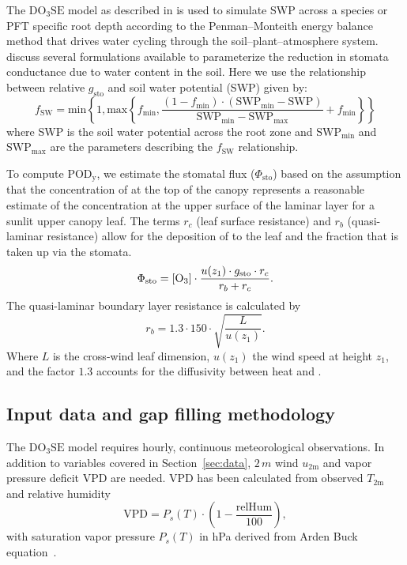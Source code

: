 \documentclass[bg, manuscript]{copernicus}
\begin{document}
The $\mathrm{DO_3SE}$ model as described in \citet{ACP:Bueker2012} is used to simulate SWP across a species or PFT specific root depth according to the Penman--Monteith energy balance method that drives water cycling through the soil--plant--atmosphere system. \citet{ACP:Bueker2012} discuss several formulations available to parameterize the reduction in stomata conductance due to water content in the soil. Here we use the relationship between relative $g_\mathrm{sto}$ and soil water potential (SWP) given by:
%
\begin{equation}
  f_\mathrm{SW} = \text{min}\left\{1, \text{max}\left\{f_\mathrm{min}, \frac{(1 - f_\mathrm{min})\cdot(\mathrm{SWP_{min}} - \mathrm{SWP})}{\mathrm{SWP_{min}} - \mathrm{SWP_{max}}} + f_\mathrm{min} \right\} \right\}
    \label{eq:fsw}
\end{equation}
%
where SWP is the soil water potential across the root zone and $\mathrm{SWP_{min}}$ and $\mathrm{SWP_{max}}$ are the parameters describing the $f_\mathrm{SW}$ relationship.

To compute $\mathrm{POD_y}$, we estimate the stomatal  flux ($\Phi_\mathrm{sto}$) based on the assumption that the concentration of  at the top of the canopy represents a reasonable estimate of the concentration at the upper surface of the laminar layer for a sunlit upper canopy leaf. The terms $r_c$ (leaf surface resistance) and $r_b$ (quasi-laminar resistance) allow for the deposition of  to the leaf and the fraction that is taken up via the stomata. 
%
\begin{equation}
  \Phi_\mathrm{sto} = \chem{[O_3]} \cdot \frac{u(z_1) \cdot g_\mathrm{sto} \cdot r_c}{r_b + r_c}.
  \label{eq:flux_stomata}
\end{equation}
%
The quasi-laminar boundary layer resistance is calculated by
%
\begin{equation}
  r_b = 1.3 \cdot 150 \cdot \sqrt{\frac{L}{u(z_1)}}.
  \label{eq:quasi_laminar_resist}
\end{equation}
%
Where $L$ is the cross-wind leaf dimension, $u(z_1)$ the wind speed at height $z_1$, and the factor $1.3$ accounts for the diffusivity between heat and . 

\subsection{Input data and gap filling methodology}
\label{subsec:ozone_reco}
The $\mathrm{DO_3SE}$ model requires hourly, continuous meteorological observations. In addition to variables covered in Section~\ref{sec:data}, $2\,\unit{m}$ wind $u_\text{2m}$ and vapor pressure deficit VPD are needed. VPD has been calculated from observed $T_\text{2m}$ and relative humidity
\begin{equation}
  \text{VPD} = P_s(T) \cdot \left(1-\frac{\text{relHum}}{100}\right),
\end{equation}
with saturation vapor pressure $P_s(T)$ in \unit{hPa} derived from Arden Buck equation~\citep{JAP:Buck1981, Buck2012}.
  
\end{document}
